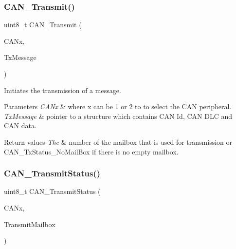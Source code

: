 \subsubsection{\texorpdfstring{CAN\_Transmit()}{CAN\_Transmit()}}
{\footnotesize\ttfamily uint8\+\_\+t C\+A\+N\+\_\+\+Transmit (\begin{DoxyParamCaption}\item[{\mbox{\hyperlink{struct_c_a_n___type_def}{C\+A\+N\+\_\+\+Type\+Def}} $\ast$}]{C\+A\+Nx,  }\item[{\mbox{\hyperlink{struct_can_tx_msg}{Can\+Tx\+Msg}} $\ast$}]{Tx\+Message }\end{DoxyParamCaption})}



Initiates the transmission of a message. 


\begin{DoxyParams}{Parameters}
{\em C\+A\+Nx} & where x can be 1 or 2 to to select the C\+AN peripheral. \\
\hline
{\em Tx\+Message} & pointer to a structure which contains C\+AN Id, C\+AN D\+LC and C\+AN data. \\
\hline
\end{DoxyParams}

\begin{DoxyRetVals}{Return values}
{\em The} & number of the mailbox that is used for transmission or C\+A\+N\+\_\+\+Tx\+Status\+\_\+\+No\+Mail\+Box if there is no empty mailbox. \\
\hline
\end{DoxyRetVals}
\mbox{\label{group___c_a_n___exported___functions_ga68ab05a0a6cdfcc2b6f6b6b2c10848e2}} 
\subsubsection{\texorpdfstring{CAN\_TransmitStatus()}{CAN\_TransmitStatus()}}
{\footnotesize\ttfamily uint8\+\_\+t C\+A\+N\+\_\+\+Transmit\+Status (\begin{DoxyParamCaption}\item[{\mbox{\hyperlink{struct_c_a_n___type_def}{C\+A\+N\+\_\+\+Type\+Def}} $\ast$}]{C\+A\+Nx,  }\item[{uint8\+\_\+t}]{Transmit\+Mailbox }\end{DoxyParamCaption})}



